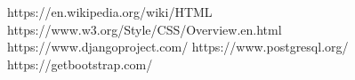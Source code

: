 \begin{thebibliography}{9}
	https://en.wikipedia.org/wiki/HTML
	https://www.w3.org/Style/CSS/Overview.en.html
	https://www.djangoproject.com/
	https://www.postgresql.org/
	https://getbootstrap.com/
\end{thebibliography}
